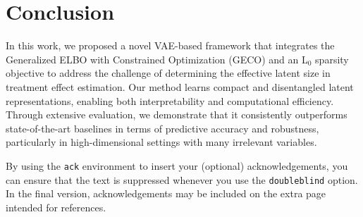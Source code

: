 \documentclass[doubleblind]{ecai}
\begin{document}
	
	\section{Conclusion}
	
	In this work, we proposed a novel VAE-based framework that integrates the Generalized ELBO with Constrained Optimization (GECO) and an L$_0$ sparsity objective to address the challenge of determining the effective latent size in treatment effect estimation. Our method learns compact and disentangled latent representations, enabling both interpretability and computational efficiency. Through extensive evaluation, we demonstrate that it consistently outperforms state-of-the-art baselines in terms of predictive accuracy and robustness, particularly in high-dimensional settings with many irrelevant variables.
	
	

	
	
	\begin{ack}
		By using the \texttt{ack} environment to insert your (optional) 
		acknowledgements, you can ensure that the text is suppressed whenever 
		you use the \texttt{doubleblind} option. In the final version, 
		acknowledgements may be included on the extra page intended for references.
	\end{ack}
	
	
	
	
	
\end{document}
